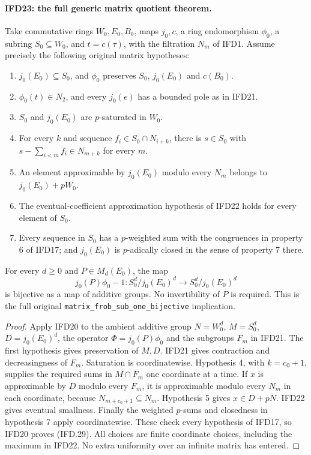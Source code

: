 \documentclass[11pt,a4paper]{article}
\numberwithin{equation}{section}
\theoremstyle{remark}\newtheorem{remark}[theorem]{Remark}
\begin{document}
\paragraph{IFD23: the full generic matrix quotient theorem.}
\label{claim:IFD23}
Take commutative rings $W_0,E_0,B_0$, maps $j_0,c$, a ring
endomorphism $\phi_0$, a subring $S_0\subseteq W_0$, and
$t=c(\tau)$, with the filtration $N_m$ of IFD1.
Assume precisely the following original matrix hypotheses:
\begin{enumerate}
\item $j_0(E_0)\subseteq S_0$, and $\phi_0$ preserves $S_0$,
      $j_0(E_0)$ and $c(B_0)$.
\item $\phi_0(t)\in N_2$, and every $j_0(e)$ has a bounded
      pole as in IFD21.
\item $S_0$ and $j_0(E_0)$ are $p$-saturated in $W_0$.
\item For every $k$ and sequence $f_i\in S_0\cap N_{i+k}$,
      there is $s\in S_0$ with
      $s-\sum_{i<m}f_i\in N_{m+k}$ for every $m$.
\item An element approximable by $j_0(E_0)$ modulo every
      $N_m$ belongs to $j_0(E_0)+pW_0$.
\item The eventual-coefficient approximation hypothesis of
      IFD22 holds for every element of $S_0$.
\item Every sequence in $S_0$ has a $p$-weighted sum with the
      congruences in property 6 of IFD17; and $j_0(E_0)$ is
      $p$-adically closed in the sense of property 7 there.
\end{enumerate}
For every $d\geq0$ and $P\in M_d(E_0)$, the map
\[
             j_0(P)\phi_0-1:S_0^d/j_0(E_0)^d
                                    \longrightarrow S_0^d/j_0(E_0)^d
                                                               \tag{IFD.29}
\]
is bijective as a map of additive groups. No invertibility of $P$
is required. This is the full original
\texttt{matrix\_\allowbreak frob\_\allowbreak sub\_\allowbreak one\_\allowbreak bijective} implication.

\begin{proof}
Apply IFD20 to the ambient additive group $N=W_0^d$,
$M=S_0^d$, $D=j_0(E_0)^d$, the operator
$\Phi=j_0(P)\phi_0$ and the subgroups $F_m$ in IFD21.
The first hypothesis gives preservation of $M,D$.
IFD21 gives contraction and decreasingness of $F_m$.
Saturation is coordinatewise. Hypothesis 4, with $k=c_0+1$,
supplies the required sums in $M\cap F_m$ one coordinate at a time.
If $x$ is approximable by $D$ modulo every $F_m$, it is
approximable modulo every $N_m$ in each coordinate, because
$N_{m+c_0+1}\subseteq N_m$. Hypothesis 5 gives $x\in D+pN$.
IFD22 gives eventual smallness. Finally the weighted $p$-sums
and closedness in hypothesis 7 apply coordinatewise.
These check every hypothesis of IFD17, so IFD20 proves (IFD.29).
All choices are finite coordinate choices, including the maximum
in IFD22. No extra uniformity over an infinite matrix has entered.
\end{proof}
\end{document}
